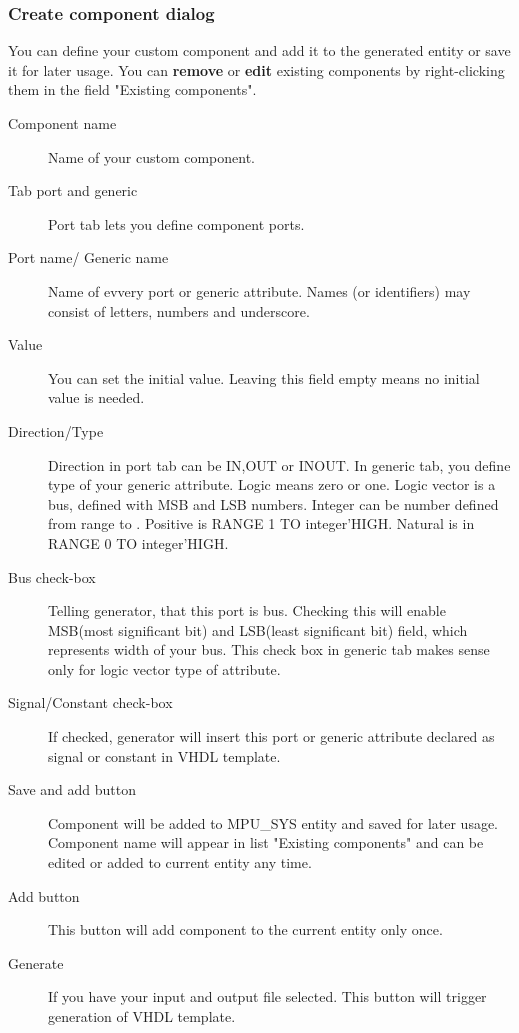 \subsubsection{Create component dialog}
    You can define your custom component and add it to the generated entity or save it for later usage. You can \textbf{remove} or \textbf{edit} existing components by
    right-clicking them in the field "Existing components".
    \begin{description}
        \item [Component name]
            Name of your custom component.
        \item [Tab port and generic]
            Port tab lets you define component ports. 
        \item [Port name/ Generic name]
            Name of evvery port or generic attribute. Names (or identifiers) may consist of letters, numbers and underscore.
        \item [Value]
            You can set the initial value. Leaving this field empty means no initial value is needed.
        \item [Direction/Type]
            Direction in port tab can be IN,OUT or INOUT. In generic tab, you define type of your generic attribute. Logic means zero or one. Logic vector is a bus, defined with MSB and LSB numbers.
            Integer can be number defined from range  to . Positive is RANGE 1 TO integer’HIGH. Natural is in RANGE 0 TO integer’HIGH.
        \item [Bus check-box]
            Telling generator, that this port is bus. Checking this will enable MSB(most significant bit) and LSB(least significant bit) field, which represents width of your bus.
            This check box in generic tab makes sense only for logic vector type of attribute.
        \item [Signal/Constant check-box]
            If checked, generator will insert this port or generic attribute declared as signal or constant in VHDL template.
        \item [Save and add button]
            Component will be added to MPU\_SYS entity and saved for later usage. Component name will appear in list "Existing components" and can be edited or added to current entity any time.
        \item [Add button]
            This button will add component to the current entity only once. 
        \item [Generate]
            If you have your input and output file selected. This button will trigger generation of VHDL template.
    \end{description}
    
